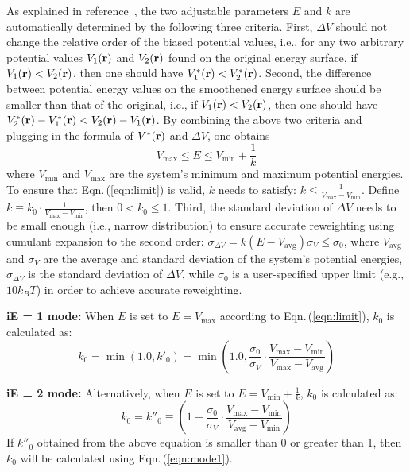 As explained in reference~\cite{MIAO2015mc}, the two adjustable parameters $E$ and $k$ are automatically determined by the following three criteria. 
First, $\Delta V$ should not change the relative order of the biased potential values, i.e., for any two arbitrary potential values $V_1 (\bf r)$ and $V_2 (\bf r)$ found on the original energy surface, if $V_1 ({\bf r}) < V_2 ({\bf r})$, 
then one should have $ V_1^* ({\bf r}) < V_2^* ({\bf r})$.
Second, the difference between potential energy values on the smoothened energy surface should be smaller than that of the original, 
i.e., if $V_1 ({\bf r}) < V_2 ({\bf r})$,  then one should have $ V_2^* ({\bf r}) - V_1^* ({\bf r}) < V_2 ({\bf r}) - V_1 ({\bf r})$.
By combining the above two criteria and plugging in the formula of $V^* ({\bf r})$ and $\Delta V$, one obtains
\begin{equation}
V_\text{max} \leq E \leq V_\text{min} + \frac{1}{k}
\label{eqn:limit}
\end{equation}
where $V_\text{min}$ and $V_\text{max}$ are the system's minimum and maximum potential energies. To ensure that Eqn.\,(\ref{eqn:limit}) is valid, $k$ needs 
to satisfy: $k \leq \frac{1}{ V_\text{max} - V_\text{min} }$. 
Define $k \equiv k_0 \cdot \frac{1}{V_\text{max} - V_\text{min}}$, then $0 < k_0 \leq 1$.
Third, the standard deviation of $\Delta V$ needs to be small enough (i.e., narrow distribution) to ensure accurate reweighting using cumulant expansion to the second order: 
$\sigma_{\Delta V} = k \left( E - V_\text{avg} \right) \sigma_V \leq \sigma_0$, 
where $V_\text{avg}$ and $\sigma_V$ are the average and standard deviation of the system's potential energies, 
$\sigma_{\Delta V}$ is the standard deviation of $\Delta V$, while $\sigma_0$ is a user-specified upper limit (e.g., $10 k_B T$) in order to achieve accurate reweighting.

{\bf iE = 1 mode:} When $E$ is set to $E = V_\text{max}$ according to Eqn.\,(\ref{eqn:limit}), 
$k_0$ is calculated as:
\begin{equation}
k_0 = \min(1.0, k'_0) = \min \left( 1.0, \frac{\sigma_0}{\sigma_V} \cdot
\frac{V_\text{max} - V_\text{min}}{V_\text{max} - V_\text{avg}} \right)
\label{eqn:mode1}
\end{equation}

{\bf iE = 2 mode:} Alternatively, when $E$ is set to $E = V_\text{min} + \frac{1}{k}$, 
$k_0$ is calculated as:
\begin{equation}
k_0 = k''_0 \equiv \left( 1 - \frac{\sigma_0}{\sigma_V} \cdot 
\frac{V_\text{max} - V_\text{min}}{V_\text{avg} - V_\text{min}} \right)
\label{eqn:mode2}
\end{equation}
If $k''_0$ obtained from the above equation is smaller than 0 or greater than 1, then $k_0$ will be calculated using Eqn.\,(\ref{eqn:mode1}).

